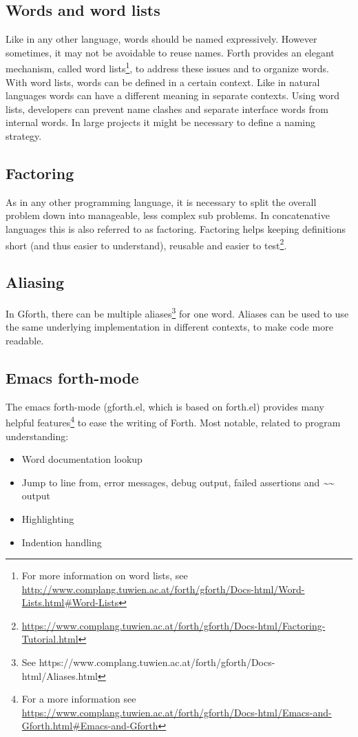 \subsection*{Words and word lists}
Like in any other language, words should be named expressively. However sometimes, it may not be avoidable to reuse names. Forth provides an elegant mechanism, called word lists\footnote{For more information on word lists, see \url{http://www.complang.tuwien.ac.at/forth/gforth/Docs-html/Word-Lists.html\#Word-Lists}}, to address these issues and to organize words. With word lists, words can be defined in a certain context. Like in natural languages words can have a different meaning in separate contexts. Using word lists, developers can prevent name clashes and separate interface words from internal words. In large projects it might be necessary to define a naming strategy.

\subsection*{Factoring}
As in any other programming language, it is necessary to split the overall problem down into manageable, less complex sub problems. In concatenative languages this is also referred to as factoring. Factoring helps keeping definitions short (and thus easier to understand), reusable and easier to test\footnote{\url{https://www.complang.tuwien.ac.at/forth/gforth/Docs-html/Factoring-Tutorial.html}}.

\subsection*{Aliasing}
In Gforth, there can be multiple aliases\footnote{See https://www.complang.tuwien.ac.at/forth/gforth/Docs-html/Aliases.html} for one word. Aliases can be used to use the same underlying implementation in different contexts, to make code more readable.

\subsection*{Emacs forth-mode}

The emacs forth-mode (gforth.el, which is based on forth.el) provides many helpful features\footnote{For a more information see \url{https://www.complang.tuwien.ac.at/forth/gforth/Docs-html/Emacs-and-Gforth.html\#Emacs-and-Gforth}} to ease the writing of Forth. Most notable, related to program understanding:
\begin{itemize}
\item Word documentation lookup
\item Jump to line from, error messages, debug output, failed assertions and \emph{\textasciitilde\textasciitilde} output
\item Highlighting
\item Indention handling
\end{itemize}

